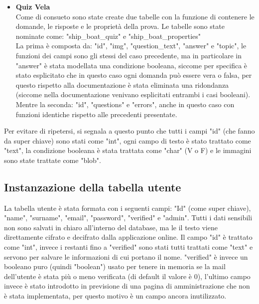\begin{itemize}
	\item \textbf{Quiz Vela}\\
	Come di consueto sono state create due tabelle con la funzione di contenere le domande, le risposte e le proprietà della prova. Le tabelle sono state nominate come: "ship\_boat\_quiz" e "ship\_boat\_properties"\\
	La prima è composta da: "id", "img", "question\_text", "answer" e "topic", le funzioni dei campi sono gli stessi del caso precedente, ma in particolare in "answer" è stata modellata una condizione booleana, siccome per specifica è stato esplicitato che in questo caso ogni domanda può essere vera o falsa, per questo rispetto alla documentazione è stata eliminata una ridondanza (siccome nella documentazione venivano esplicitati entrambi i casi booleani). Mentre la seconda: "id", "questions" e "errors", anche in questo caso con funzioni identiche rispetto alle precedenti presentate.  
\end{itemize}

Per evitare di ripetersi, si segnala a questo punto che tutti i campi "id" (che fanno da super chiave) sono stati come "int", ogni campo di testo è stato trattato come "text", la condizione booleana è stata trattata come "char" (V o F) e le immagini sono state trattate come "blob". 

\subsection{Instanzazione della tabella utente}
La tabella utente è stata formata con i seguenti campi: "Id" (come super chiave), "name", "surname", "email", "password", "verified" e "admin". Tutti i dati sensibili non sono salvati in chiaro all'interno del database, ma le il testo viene direttamente cifrato e decifrato dalla applicazione online. Il campo "id" è trattato come "int", invece i restanti fino a "verified" sono stati tutti trattati come "text" e servono per salvare le informazioni di cui portano il nome. "verified" è invece un booleano puro (quindi "boolean") usato per tenere in memoria se la mail dell'utente è stata più o meno verificata (di default il valore è 0), l'ultimo campo invece è stato introdotto in previsione di una pagina di amministrazione che non è stata implementata, per questo motivo è un campo ancora inutilizzato. 